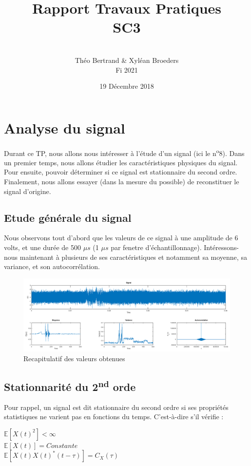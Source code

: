 \documentclass[french, a4paper, 12pt, openany]{book}
\title{\Huge{Rapport Travaux Pratiques \\ SC3}}
\author{\\ Théo Bertrand \& Xyléan Broeders \\ Fi 2021}
\date{19 Décembre 2018}
\begin{document}
\maketitle

\chapter{Analyse du signal}
	Durant ce TP, nous allons nous intéresser à l'étude d'un signal (ici le n\textsuperscript{o}8). Dans un premier temps, nous allons étudier les caractéristiques physiques du signal.  Pour ensuite, pouvoir déterminer si ce signal est stationnaire du second ordre. Finalement, nous allons essayer (dans la mesure du possible) de reconstituer le signal d'origine.
\section{Etude générale du signal}
	Nous observons tout d'abord que les valeurs de ce signal à une amplitude de 6 volts, et une durée de 500 $\mu s$ (1 $\mu s$ par fenetre d'échantillonnage). Intéressons-nous maintenant à plusieurs de ses caractéristiques et notamment sa moyenne, sa variance, et son autocorrélation.
  \begin{figure}[ht]
    \begin{center}
    \includegraphics[scale=0.25]{images/SignalFull.png}
    \end{center}
    \caption{Recapitulatif des valeurs obtenues}
    \label{Recapitulatif des valeurs obtenues}
  \end{figure}

\section{Stationnarité du 2\textsuperscript{nd} orde}
	Pour rappel, un signal est dit stationnaire du second ordre si ses propriétés statistiques ne varient pas en fonctions du temps. C'est-à-dire s'il vérifie :
  \begin{center}
  	\begin{math}\mathbb{E}[X(t)^2]<\infty\end{math} \\
  	\begin{math}\mathbb{E}[X(t)]=Constante\end{math} \\
  	\begin{math}\mathbb{E}[X(t)X(t)^*(t-\tau)]=C_X(\tau)\end{math}
  \end{center}
	\newpage
\end{document}
